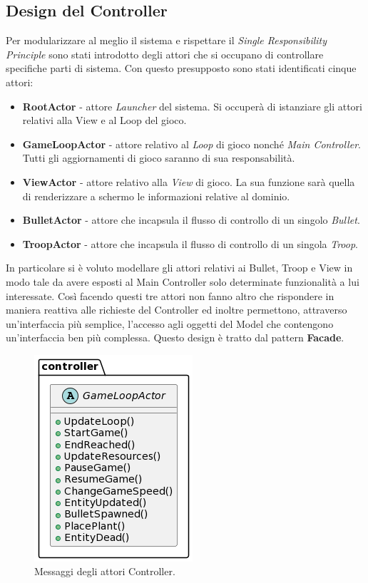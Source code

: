 \subsection{Design del Controller}
Per modularizzare al meglio il sistema e rispettare il \textit{Single Responsibility Principle}
sono stati introdotto degli attori che si occupano di controllare specifiche parti di sistema. Con questo presupposto sono
stati identificati cinque attori:
\begin{itemize}
    \item \textbf{RootActor} - attore \textit{Launcher} del sistema. Si occuperà di
    istanziare gli attori relativi alla View e al Loop del gioco.
    \item \textbf{GameLoopActor} - attore relativo al \textit{Loop} di gioco nonché
    \textit{Main Controller}. Tutti gli aggiornamenti di gioco saranno di sua responsabilità.
    \item \textbf{ViewActor} - attore relativo alla \textit{View} di gioco.
    La sua funzione sarà quella di renderizzare a schermo le informazioni relative al dominio.
    \item \textbf{BulletActor} - attore che incapsula il flusso di controllo di un singolo \textit{Bullet}.
    \item \textbf{TroopActor} - attore che incapsula il flusso di controllo di un singola \textit{Troop}.
\end{itemize}
In particolare si è voluto modellare gli attori relativi ai Bullet, Troop e
View in modo tale da avere esposti al Main
Controller solo determinate funzionalità a lui interessate.
Così facendo questi tre attori non fanno altro che rispondere
in maniera reattiva alle richieste del Controller ed inoltre permettono,
attraverso un'interfaccia più semplice, l'accesso
agli oggetti del Model che contengono un'interfaccia ben più complessa.
Questo design è tratto dal pattern \textbf{Facade}.

\begin{figure}[H]
    \centering
    \includegraphics[width=0.61\linewidth]{images/detail-controller.png}
    \caption{Messaggi degli attori Controller.}
\end{figure}




